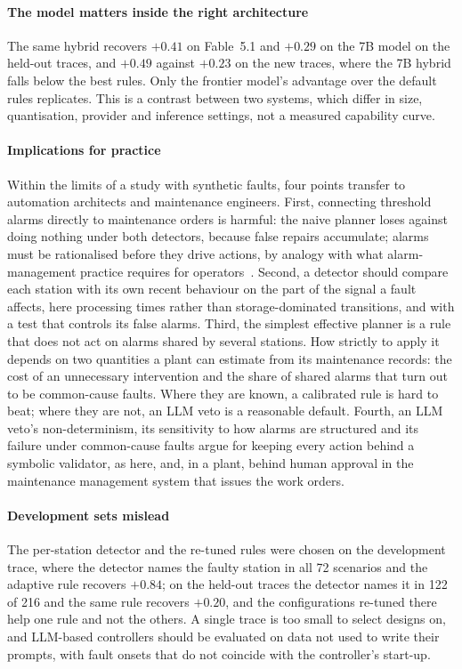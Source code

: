 \documentclass[preprint,11pt]{elsarticle}
\begin{document}
\paragraph{The model matters inside the right architecture}
The same hybrid recovers $+0.41$ on Fable~5.1 and $+0.29$ on the 7B model on the held-out traces, and $+0.49$ against $+0.23$ on the new traces, where the 7B hybrid falls below the best rules. Only the frontier model's advantage over the default rules replicates. This is a contrast between two systems, which differ in size, quantisation, provider and inference settings, not a measured capability curve.

\paragraph{Implications for practice}
Within the limits of a study with synthetic faults, four points transfer to automation architects and maintenance engineers. First, connecting threshold alarms directly to maintenance orders is harmful: the naive planner loses against doing nothing under both detectors, because false repairs accumulate; alarms must be rationalised before they drive actions, by analogy with what alarm-management practice requires for operators~\cite{isa182,isatr1826}. Second, a detector should compare each station with its own recent behaviour on the part of the signal a fault affects, here processing times rather than storage-dominated transitions, and with a test that controls its false alarms. Third, the simplest effective planner is a rule that does not act on alarms shared by several stations. How strictly to apply it depends on two quantities a plant can estimate from its maintenance records: the cost of an unnecessary intervention and the share of shared alarms that turn out to be common-cause faults. Where they are known, a calibrated rule is hard to beat; where they are not, an LLM veto is a reasonable default. Fourth, an LLM veto's non-determinism, its sensitivity to how alarms are structured and its failure under common-cause faults argue for keeping every action behind a symbolic validator, as here, and, in a plant, behind human approval in the maintenance management system that issues the work orders.

\paragraph{Development sets mislead}
The per-station detector and the re-tuned rules were chosen on the development trace, where the detector names the faulty station in all 72 scenarios and the adaptive rule recovers $+0.84$; on the held-out traces the detector names it in 122 of 216 and the same rule recovers $+0.20$, and the configurations re-tuned there help one rule and not the others. A single trace is too small to select designs on, and LLM-based controllers should be evaluated on data not used to write their prompts, with fault onsets that do not coincide with the controller's start-up.
\end{document}
